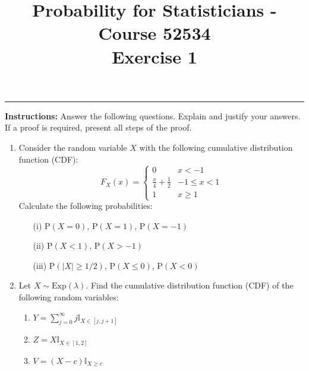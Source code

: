 \documentclass[12pt]{article}
\title{Probability for Statisticians - Course 52534 \\ \textbf{Exercise 1}}
\date{} %
\newcommand{\indicator}[1]{\mathbb{I}_{#1}}
\begin{document}
\maketitle
\thispagestyle{empty}

\noindent\rule{\textwidth}{0.4pt} %

\vspace{0.5cm}

\noindent \textbf{Instructions:} Answer the following questions. Explain and justify your answers. If a proof is required, present all steps of the proof.

\vspace{0.5cm}

\begin{enumerate}
    \item Consider the random variable $X$ with the following cumulative distribution function (CDF):
        \[
            F_X(x)=\left\{\begin{array}{cl}
                0                           & x<-1      \\
                \frac{x}{4}+\frac{1}{2} & -1 \leq x<1 \\
                1                           & x \geq 1
            \end{array}\right.
        \]
        Calculate the following probabilities:
        \begin{enumerate}
            \item[(i)] $\mathrm{P}(X=0)$, $\mathrm{P}(X=1)$, $\mathrm{P}(X=-1)$
            \item[(ii)] $\mathrm{P}(X < 1)$, $\mathrm{P}(X > -1)$
            \item[(iii)] $\mathrm{P}(|X| \geq 1/2)$, $\mathrm{P}(X \leq 0)$, $\mathrm{P}(X < 0)$
        \end{enumerate}

        \vspace{0.5cm}

    \item Let $X \sim \text{Exp}(\lambda)$. Find the cumulative distribution function (CDF) of the following random variables:
        \begin{enumerate} %
            \item $Y=\sum_{j=0}^{\infty} j \indicator{X \in[j, j+1]}$
            \item $Z=X \indicator{X \in[1,2]}$
            \item $V=(X-c) \indicator{X \geq c}$
        \end{enumerate}


\end{enumerate}
\end{document}
